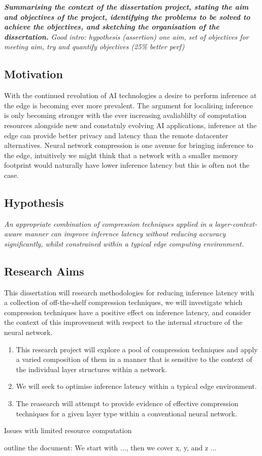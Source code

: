 \documentclass[../D1.tex]{subfiles}
\begin{document}
\emph{\textbf{Summarising the context of the dissertation project, stating the aim and objectives of the project, 
identifying the problems to be solved to achieve the objectives, and sketching the organisation of the dissertation.}}
\emph{Good intro: hypothesis (assertion) one aim, set of objectives for meeting aim, try and quantify objectives (25\% better perf)}
\subsection{Motivation}
With the continued revolution of AI technologies a desire to perform inference at the edge is becoming ever more prevalent.
The argument for localising inference is only becoming stronger with the ever increasing avaliablilty of computation resources alongside new and constatnly evolving AI applications, inference at the edge can provide better privacy and latency than the remote datacenter alternatives.
Neural network compression is one avenue for bringing inference to the edge, intuitively we might think that a network with a smaller memory footprint would naturally have lower inference latency but this is often not the case.

\subsection{Hypothesis}
\emph{An appropriate combination of compression techniques applied in a layer-context-aware manner can improve inference latency without reducing accuracy significantly, whilst constrained within a typical edge computing environment.}

\subsection{Research Aims}
This dissertation will research methodologies for reducing inference latency with a collection of off-the-shelf compression techniques, we will investigate which compression techniques have a positive effect on inference latency, and consider the context of this improvement with respect to the internal structure of the neural network.

\begin{enumerate}
    \item This research project will explore a pool of compression techniques and apply a varied composition of them in a manner that is sensitive to the context of the individual layer structures within a network.
    \item We will seek to optimise inference latency within a typical edge environment.
    \item The reasearch will attempt to provide evidence of effective compression techniques for a given layer type within a conventional neural network.
\end{enumerate}


Issues with limited resource computation \autocite{szeEfficientProcessingDeep2017}


outline the document: We start with ..., then we cover x, y, and z ...
\end{document}
